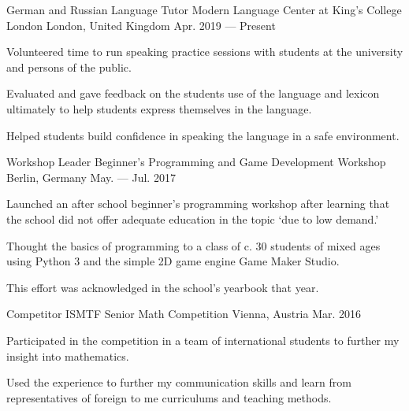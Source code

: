 \begin{cventries}
  \cventry
  {German and Russian Language Tutor} %
  {Modern Language Center at King’s College London} %
  {London, United Kingdom} %
  {Apr. 2019 --- Present} %
  {
    \begin{cvitems} %
      \item {Volunteered time to run speaking practice sessions with students at the university and persons of the public.}
      \item {Evaluated and gave feedback on the students use of the language and lexicon ultimately to help students express themselves in the language.}
      \item {Helped students build confidence in speaking the language in a safe environment.}
    \end{cvitems}
  }

  \cventry
  {Workshop Leader} %
  {Beginner's Programming and Game Development Workshop} %
  {Berlin, Germany} %
  {May. --- Jul. 2017} %
  {
    \begin{cvitems} %
      \item {Launched an after school beginner’s programming workshop after learning that the school did not offer adequate education in the topic `due to low demand.'}
      \item {Thought the basics of programming to a class of c. 30 students of mixed ages using Python 3 and the simple 2D game engine Game Maker Studio.}
      \item {This effort was acknowledged in the school’s yearbook that year.}
    \end{cvitems}
  }

  \cventry
  {Competitor} %
  {ISMTF Senior Math Competition} %
  {Vienna, Austria} %
  {Mar. 2016} %
  {
    \begin{cvitems} %
      \item {Participated in the competition in a team of international students to further my insight into mathematics.}
      \item {Used the experience to further my communication skills and learn from representatives of foreign to me curriculums and teaching methods.}
    \end{cvitems}
  }
\end{cventries}
